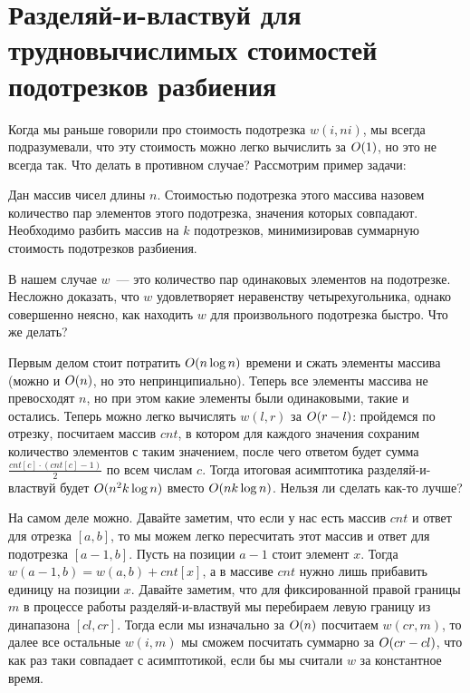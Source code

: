 \section{Разделяй-и-властвуй для трудновычислимых стоимостей подотрезков разбиения}

Когда мы раньше говорили про стоимость подотрезка $w(i, ni)$, мы всегда подразумевали, что эту стоимость можно легко вычислить за $O(1)$, но это не всегда так. Что делать в противном случае? Рассмотрим пример задачи:

\begin{problem}
    Дан массив чисел длины $n$. Стоимостью подотрезка этого массива назовем количество пар элементов этого подотрезка, значения которых совпадают. Необходимо разбить массив на $k$ подотрезков, минимизировав суммарную стоимость подотрезков разбиения.
\end{problem}

В нашем случае $w$~--- это количество пар одинаковых элементов на подотрезке. Несложно доказать, что $w$ удовлетворяет неравенству четырехугольника, однако совершенно неясно, как находить $w$ для произвольного подотрезка быстро. Что же делать?

Первым делом стоит потратить $O(n \log n)$ времени и сжать элементы массива (можно и $O(n)$, но это непринципиально). Теперь все элементы массива не превосходят $n$, но при этом какие элементы были одинаковыми, такие и остались. Теперь можно легко вычислять $w(l, r)$ за $O(r - l)$: пройдемся по отрезку, посчитаем массив $cnt$, в котором для каждого значения сохраним количество элементов с таким значением, после чего ответом будет сумма $\frac{cnt[c] \cdot (cnt[c] - 1)}{2}$ по всем числам $c$. Тогда итоговая асимптотика разделяй-и-властвуй будет $O(n^2 k \log n)$ вместо $O(n k \log n)$. Нельзя ли сделать как-то лучше?

На самом деле можно. Давайте заметим, что если у нас есть массив $cnt$ и ответ для отрезка $[a, b]$, то мы можем легко пересчитать этот массив и ответ для подотрезка $[a - 1, b]$. Пусть на позиции $a - 1$ стоит элемент $x$. Тогда $w(a - 1, b) = w(a, b) + cnt[x]$, а в массиве $cnt$ нужно лишь прибавить единицу на позиции $x$. Давайте заметим, что для фиксированной правой границы $m$ в процессе работы разделяй-и-властвуй мы перебираем левую границу из динапазона $[cl, cr]$. Тогда если мы изначально за $O(n)$ посчитаем  $w(cr, m)$, то далее все остальные $w(i, m)$ мы сможем посчитать суммарно за $O(cr - cl)$, что как раз таки совпадает с асимптотикой, если бы мы считали $w$ за константное время.

